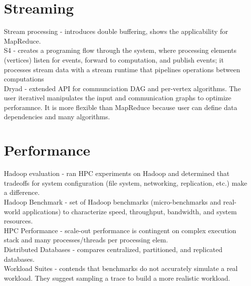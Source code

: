 \documentclass{article}
\begin{document}
\section{Streaming}
\noindent\cite{rixner:2002-stream} Stream processing - introduces double buffering, shows the applicability for MapReduce.\\

\noindent\cite{neumeyer:icdmw2010-s4} S4 - creates a programing flow through the system, where processing elements (vertices) listen for events, forward to computation, and publish events; it processes stream data with a stream runtime that pipelines operations between computations\\

\noindent\cite{isard:EuroSys2007-dryad} Dryad - extended API for communciation DAG and per-vertex algorithms. The user iterativel manipulates the input and communication graphs to optimize perforamnce. It is more flexible than MapReduce because user can define data dependencies and many algorithms.\\
 

\section{Performance}

\noindent\cite{fadika:cloud2012-evaluating-hadoop} Hadoop evaluation - ran HPC experiments on Hadoop and determined that tradeoffs for system configuration (file system, networking, replication, etc.) make a difference.\\

\noindent\cite{huang:icde2010-hibench} Hadoop Benchmark - set of Hadoop benchmarks (micro-benchmarks and real-world applications) to characterize speed, throughput, bandwidth, and system resources.\\

\noindent\cite{wisniewski:2007europar-commercial-scale-out} HPC Performance - scale-out performance is contingent on complex execution stack and many processes/threads per processing elem.\\

\noindent\cite{chen:2012ccpe-distributed-db} Distributed Databases - compares centralized, partitioned, and replicated databases.\\

\noindent\cite{chen:2011mascots-suites} Workload Suites - contends that benchmarks do not accurately simulate a real workload. They suggest sampling a trace to build a more realistic workload.\\
\end{document}

